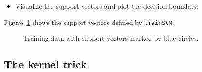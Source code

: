 \documentclass[a4]{article}
\begin{document}
\begin{itemize}
\item Visualize the support vectors and plot the decision boundary.
\end{itemize}
Figure~\ref{fig:sv} shows the support vectors defined by \texttt{trainSVM}.
\begin{figure}[!h]
	\begin{center}
		\centering
	\end{center}
	\caption{Training data with support vectors marked by blue circles.}
	\label{fig:sv}
\end{figure}


\subsection{The kernel trick}
\end{document}
